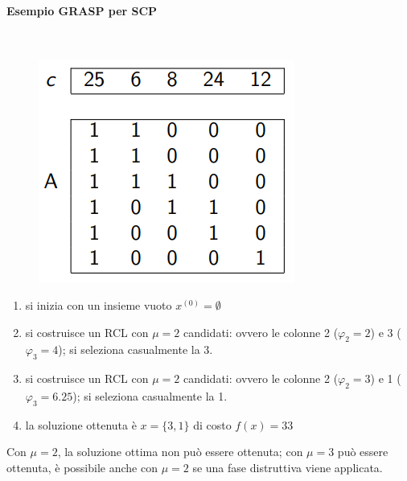\documentclass{article}
\begin{document}
\paragraph{Esempio GRASP per SCP}\mbox{}\\
\begin{figure}[H]
    \centering
    \includegraphics[scale=0.5]{images/SCP-GRASP.png}
\end{figure}

\begin{enumerate}
    \item si inizia con un insieme vuoto $x^{(0)}=\emptyset$
    \item si costruisce un RCL con $\mu=2$ candidati: ovvero le colonne 2 ($\varphi_2=2$) e 3 ($\varphi_3=4$); si seleziona casualmente la 3.
    \item si costruisce un RCL con $\mu=2$ candidati: ovvero le colonne 2 ($\varphi_2=3$) e 1 ($\varphi_3=6.25$); si seleziona casualmente la 1.
    \item la soluzione ottenuta è $x=\{3,1\}$ di costo $f(x)=33$
\end{enumerate}
Con $\mu=2$, la soluzione ottima non può essere ottenuta; con $\mu=3$ può essere ottenuta, è possibile
anche con $\mu=2$ se una fase distruttiva viene applicata.
\end{document}
